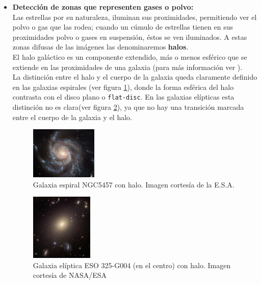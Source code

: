 \begin{itemize}
		
		\item \textbf{Detección de zonas que representen gases o polvo:}\\
		Las estrellas por su naturaleza, iluminan sus proximidades, permitiendo	ver el polvo o gas que las rodea; cuando un cúmulo de estrellas tienen en sus proximidades polvo o gases en suspensión, éstos se ven iluminados. A estas zonas difusas de las imágenes las denominaremos \textbf{halos}.
		\\
		El halo galáctico es un componente extendido, más o menos esférico que se extiende en las proximidades de una galaxia (para más información ver \cite{NASADISKHALO}).
		\\
		La distinción entre el halo y el cuerpo de la galaxia queda claramente definido en las galaxias espirales (ver figura \ref{fig:ESA_GALAXY_Espiral}), donde la forma esférica del halo contrasta con el disco plano o \texttt {flat-disc}. En las galaxias elípticas esta distinción no es clara(ver figura \ref{fig:ESO_GALAXY_Eliptica}), ya que no hay una transición marcada entre el cuerpo de la galaxia y el halo.
		\begin{figure}[!hp]
			\centering
			\includegraphics[width=0.3\textwidth]{images/Messier100_NGC5457Galaxy.jpg}
			\caption{\label{fig:ESA_GALAXY_Espiral}{\small Galaxia espiral NGC5457 con halo. Imagen cortesía de la E.S.A.}}
		\end{figure}

		\begin{figure}[!hb]
			\centering
			\includegraphics[width=0.28\textwidth]{images/ElipticalGalaxyESO325-G004.jpg}
			\caption{\label{fig:ESO_GALAXY_Eliptica}{\small Galaxia elíptica ESO 325-G004 (en el centro) con halo. Imagen cortesía de NASA/ESA} }
		\end{figure}


\end{itemize}
